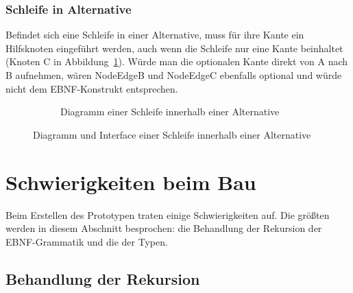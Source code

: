 \documentclass[../InterneDSLs.tex]{subfiles}
\begin{document}
\subsubsection{Schleife in Alternative}
Befindet sich eine Schleife in einer Alternative, muss für ihre Kante ein Hilfsknoten eingeführt werden, auch wenn die Schleife nur eine Kante beinhaltet (Knoten C in Abbildung~\ref{FIG:DiagramLoopInAlternative}). Würde man die optionalen Kante direkt von A nach B aufnehmen, wären NodeEdgeB und NodeEdgeC ebenfalls optional und würde nicht dem EBNF-Konstrukt entsprechen.
\begin{figure}[ht]
\centering
  \begin{subfigure}[c]{0.49\textwidth}
    \caption{Diagramm einer Schleife innerhalb einer Alternative}
    \label{FIG:DiagramLoopInAlternative}
  \end{subfigure}
  \begin{subfigure}[c]{0.49\textwidth}
    
  \end{subfigure}
  \caption{Diagramm und Interface einer Schleife innerhalb einer Alternative}
  \label{FIG:LoopInAlternative}
\end{figure}


\section{Schwierigkeiten beim Bau}
Beim Erstellen des Prototypen traten einige Schwierigkeiten auf. Die größten werden in diesem Abschnitt besprochen: die Behandlung der Rekursion der EBNF-Grammatik und die der Typen.

\subsection{Behandlung der Rekursion}
\end{document}
